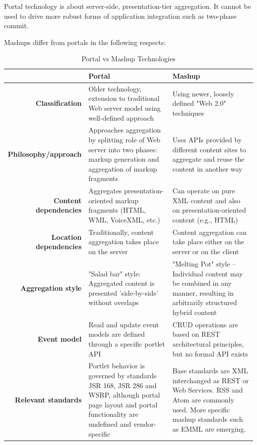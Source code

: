 		Portal technology is about server-side, presentation-tier aggregation. It cannot be used to drive more robust forms of application integration such as two-phase commit.

		Mashups differ from portals in the following respects:

		\begin{table}[H]
		\centering
		\begin{tabular}{|r|L{5cm}|L{5cm}|}
		\hline
				                       & \textbf{Portal} & \textbf{Mashup} \\
		\hline 
		\textbf{Classification}   & Older technology, extension to traditional Web server model using well-defined approach & Using newer, loosely defined "Web 2.0" techniques \\
		\hline
		\textbf{Philosophy/approach}       & Approaches aggregation by splitting role of Web server into two phases: markup generation and aggregation of markup fragments & Uses APIs provided by different content sites to aggregate and reuse the content in another way \\
		\hline
		\textbf{Content dependencies}	   & Aggregates presentation-oriented markup fragments (HTML, WML, VoiceXML, etc.) & Can operate on pure XML content and also on presentation-oriented content (e.g., HTML) \\
		\hline
		\textbf{Location dependencies}  & Traditionally, content aggregation takes place on the server & Content aggregation can take place either on the server or on the client \\
		\hline
		\textbf{Aggregation style}		   & "Salad bar" style: Aggregated content is presented 'side-by-side' without overlaps & "Melting Pot" style – Individual content may be combined in any manner, resulting in arbitrarily structured hybrid content \\
		\hline
		\textbf{Event model}		       & Read and update event models are defined through a specific portlet API & CRUD operations are based on REST architectural principles, but no formal API exists \\
		\hline
		\textbf{Relevant standards}		   & Portlet behavior is governed by standards JSR 168, JSR 286 and WSRP, although portal page layout and portal functionality are undefined and vendor-specific & Base standards are XML interchanged as REST or Web Services. RSS and Atom are commonly used. More specific mashup standards such as EMML are emerging. \\
		\hline
		\end{tabular}
		\caption[Portal vs Mashup Technology]{Portal vs Mashup Technologies}
		\label{tab:Portal_Mashup}
		\end{table}
		

